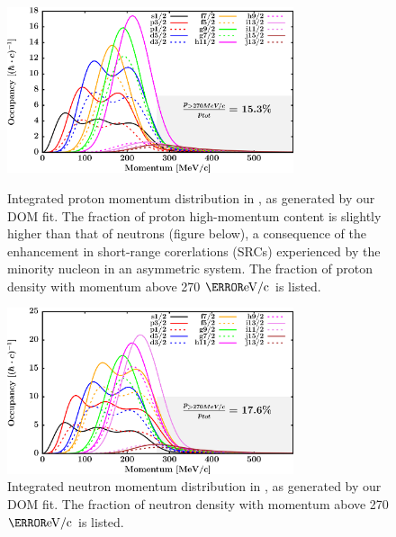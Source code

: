 \begin{figure}[tb]
    \centering
    \includegraphics[width=0.75\textwidth]{figures/pb208_protonLJMomentumDistIntegral.png}
    \caption[Proton momentum distribution in \pbEight]
    {
        Integrated proton momentum distribution in \pbEight, as generated
        by our DOM fit. The fraction of proton high-momentum content is
        slightly higher than that of neutrons
        (figure below), a consequence of the enhancement in short-range
        corerlations (SRCs) experienced by the minority nucleon in an
        asymmetric system. The fraction of proton density with
        momentum above 270 $\mega\electronvolt/\text{c}$ is listed.
    }
    \label{pb208ProtonMomentumDistInt}
    \vspace{16pt}
    \includegraphics[width=0.75\textwidth]{figures/pb208_neutronLJMomentumDistIntegral.png}
    \caption[Neutron momentum distributions in \pbEight]
    {
        Integrated neutron momentum distribution in \pbEight, as generated
        by our DOM fit. The fraction of neutron density with
        momentum above 270 $\mega\electronvolt/\text{c}$ is listed.
    }
    \label{pb208NeutronMomentumDistInt}
\end{figure}

